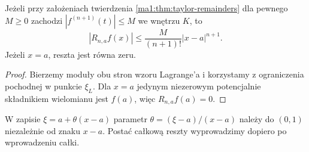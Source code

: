 \begin{wniosek}
\label{ma1:cor:taylor-error-bound}
Jeżeli przy założeniach twierdzenia \ref{ma1:thm:taylor-remainders} dla pewnego $M\ge0$ zachodzi $|f^{(n+1)}(t)|\le M$ we wnętrzu $K$, to
\[
 |R_{n,a}f(x)|\le \frac{M}{(n+1)!}|x-a|^{n+1}.
\]
Jeżeli $x=a$, reszta jest równa zeru.
\end{wniosek}
\begin{proof}
Bierzemy moduły obu stron wzoru Lagrange'a i korzystamy z ograniczenia pochodnej w punkcie $\xi_L$. Dla $x=a$ jedynym niezerowym potencjalnie składnikiem wielomianu jest $f(a)$, więc $R_{n,a}f(a)=0$.
\end{proof}
W zapisie $\xi=a+\theta(x-a)$ parametr $\theta=(\xi-a)/(x-a)$ należy do $(0,1)$ niezależnie od znaku $x-a$. Postać całkową reszty wyprowadzimy dopiero po wprowadzeniu całki.

